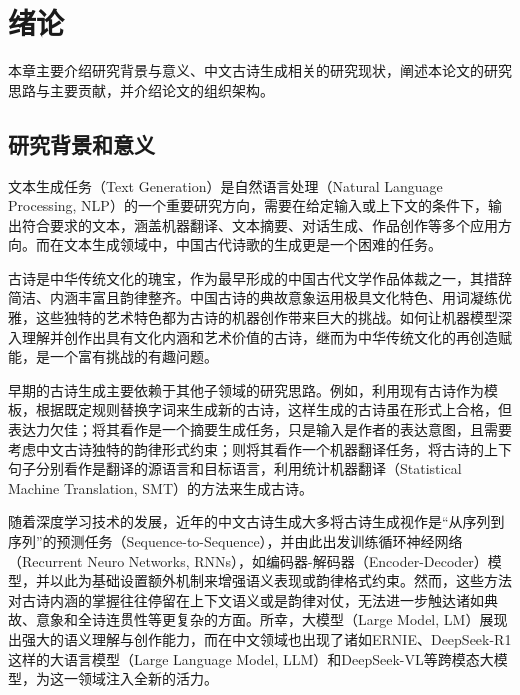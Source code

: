 
\chapter{绪论}

本章主要介绍研究背景与意义、中文古诗生成相关的研究现状，阐述本论文的研究思路与主要贡献，并介绍论文的组织架构。

\section{研究背景和意义}

文本生成任务（Text Generation）是自然语言处理（Natural Language Processing, NLP）的一个重要研究方向，需要在给定输入或上下文的条件下，输出符合要求的文本，涵盖机器翻译、文本摘要、对话生成、作品创作等多个应用方向。而在文本生成领域中，中国古代诗歌的生成更是一个困难的任务。

古诗是中华传统文化的瑰宝，作为最早形成的中国古代文学作品体裁之一，其措辞简洁、内涵丰富且韵律整齐。中国古诗的典故意象运用极具文化特色、用词凝练优雅，这些独特的艺术特色都为古诗的机器创作带来巨大的挑战。如何让机器模型深入理解并创作出具有文化内涵和艺术价值的古诗，继而为中华传统文化的再创造赋能，是一个富有挑战的有趣问题。

早期的古诗生成主要依赖于其他子领域的研究思路。例如，\cite{oliveira2012poetryme}利用现有古诗作为模板，根据既定规则替换字词来生成新的古诗，这样生成的古诗虽在形式上合格，但表达力欠佳；\cite{yanPoetAutomaticChinese2013}将其看作是一个摘要生成任务，只是输入是作者的表达意图，且需要考虑中文古诗独特的韵律形式约束；\cite{heGeneratingChineseClassical2012}则将其看作一个机器翻译任务，将古诗的上下句子分别看作是翻译的源语言和目标语言，利用统计机器翻译（Statistical Machine Translation, SMT）的方法来生成古诗。

随着深度学习技术的发展，近年的中文古诗生成大多将古诗生成视作是“从序列到序列”的预测任务（Sequence-to-Sequence），并由此出发训练循环神经网络（Recurrent Neuro Networks, RNNs），如编码器-解码器（Encoder-Decoder）模型\cite{yiGeneratingChineseClassical2017}，并以此为基础设置额外机制来增强语义表现\cite{zhangChinesePoetryGeneration2014}或韵律格式约束\cite{liRigidFormatsControlled2020,huPoetryDiffusionJointSemantic2024}。然而，这些方法对古诗内涵的掌握往往停留在上下文语义或是韵律对仗，无法进一步触达诸如典故、意象和全诗连贯性等更复杂的方面。所幸，大模型（Large Model, LM）展现出强大的语义理解与创作能力，而在中文领域也出现了诸如ERNIE\cite{zhangERNIEEnhancedLanguage2019}、DeepSeek-R1\cite{deepseek-aiDeepSeekR1IncentivizingReasoning2025}这样的大语言模型（Large Language Model, LLM）和DeepSeek-VL\cite{luDeepSeekVLRealWorldVisionLanguage2024}等跨模态大模型，为这一领域注入全新的活力。\cite{yuCharPoetChineseClassical2024}

